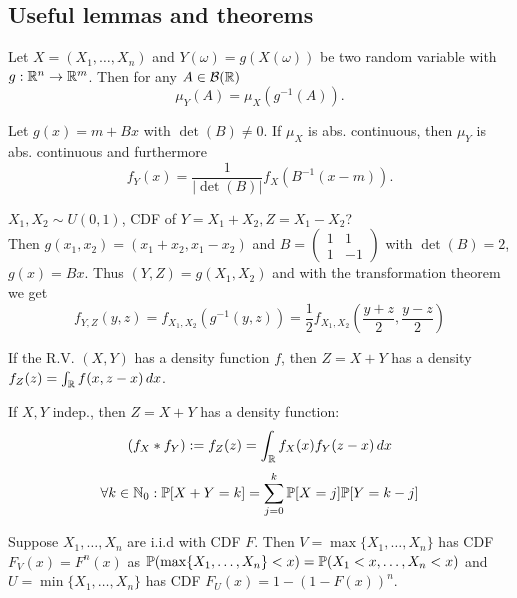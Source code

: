\subsection{Useful lemmas and theorems}

\begin{definition*}
  Let \(X = (X_1, \ldots, X_n)\) and \(Y(\omega) = g(X(\omega))\) be two random variable with \(g: \R^n \to \R^m\). Then for any \(A \in \B(\R)\)
  \[\mu_Y(A) = \mu_X(g^{-1}(A)).\]
\end{definition*}

\begin{theorem*}
  Let \(g(x) = m + Bx\) with \(\det(B) \neq 0\). If \(\mu_X\) is abs. continuous, then \(\mu_Y\) is abs. continuous and furthermore
  \[f_Y(x) = \frac{1}{|\det(B)|} f_X(B^{-1}(x - m)).\]
\end{theorem*}

\begin{example}
  \(X_1, X_2 \sim U(0, 1)\), CDF of \(Y = X_1 + X_2, Z = X_1 - X_2\)? \\
  Then \(g(x_1, x_2) = (x_1 + x_2, x_1 - x_2)\) and \(B = \begin{pmatrix}
    1 & 1 \\
    1 & -1
  \end{pmatrix}\) with \(\det (B) = 2\), \(g(x) = Bx\). Thus \((Y, Z) = g(X_1, X_2)\) and with the transformation theorem we get
  \[f_{Y, Z}(y, z) = f_{X_1, X_2}(g^{-1}(y, z)) = \frac{1}{2}f_{X_1, X_2}\left(\frac{y+z}{2}, \frac{y-z}{2}\right)\]
\end{example}

\begin{proposition}
  If the R.V. \((X, Y)\) has a density function \(f\), then \(Z = X + Y\) has a density 
  \(f_Z(z) = \int_\R f(x, z - x) \, dx\).
\end{proposition}

\begin{definition*}[Convolution]
  If \(X, Y\) indep., then \(Z = X + Y\) has a density function:
  \[(f_X * f_Y) := f_Z(z) = \int_\R f_X(x)f_Y(z - x) \, dx\]
  \[\forall k \in \N_0 : \P[X + Y = k] = \sum_{j=0}^k \P[X = j] \P[Y = k - j]\]
\end{definition*}

\begin{proposition}
  Suppose \(X_1, \ldots, X_n\) are i.i.d with CDF \(F\). Then \(V = \max\{X_1, \ldots, X_n\}\) has CDF \(F_V(x) = F^n(x) \) as \(\P(\max\{X_1, \ldots, X_n\} < x) = \P(X_1 < x, \ldots, X_n < x)\) and
  \(U = \min \{X_1, \ldots, X_n\}\) has CDF \(F_U(x) = 1 - (1 - F(x))^n\).
\end{proposition}

